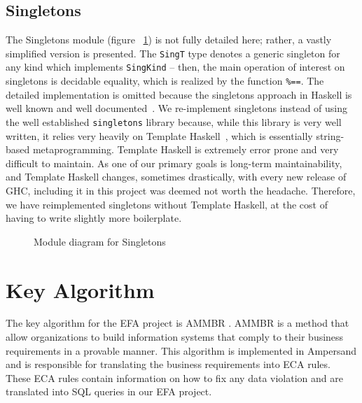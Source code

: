    
\subsection{Singletons}\label{subsec:Singletons}

The Singletons module (figure ~\ref{fig:singletons}) is 
not fully detailed here; rather, a vastly simplified version is presented. The
\lstinline{SingT} type denotes a generic singleton for 
any kind which implements
\lstinline{SingKind} -- then, the main operation of 
interest on singletons is
decidable equality, which is realized by the function 
\lstinline{%==}. The
    detailed implementation is omitted because the 
    singletons approach in Haskell
    is well known and well 
    documented~\cite{singletons}. We re-implement
    singletons instead of using the well established 
    \texttt{singletons} library
    because, while this library is very well written, 
    it relies very heavily on
    Template Haskell~\cite{th}, which is essentially 
    string-based
    metaprogramming. Template Haskell is extremely 
    error prone and very difficult
    to maintain. As one of our primary goals is 
    long-term maintainability, and
    Template Haskell changes, sometimes drastically, 
    with every new release of
    GHC, including it in this project was deemed not 
    worth the
    headache. Therefore, we have reimplemented 
    singletons without Template
    Haskell, at the cost of having to write slightly 
    more boilerplate.


\begin{figure}[!ht]
    \caption{Module diagram for Singletons} \label{fig:singletons}
\end{figure}

\section{Key Algorithm}
The key algorithm for the EFA project is AMMBR \cite{AMMBR}. AMMBR is a method 
that allow organizations to build information systems that comply to their 
business requirements in a provable manner. This algorithm is implemented in 
Ampersand and is responsible for translating the business requirements into ECA 
rules. These ECA rules contain information on how to fix any data violation and 
are translated into SQL queries in our EFA project.

